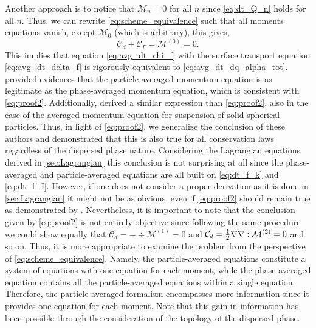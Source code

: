 Another approach is to notice that $\mathcal{M}_n=0$ for all $n$ since \ref{eq:dt_Q_n} holds for all $n$. 
Thus, we can rewrite \ref{eq:scheme_equivalence} such that all moments equations vanish, except $\mathcal{M}_0$ (which is arbitrary), this gives, 
\begin{equation}
    \mathcal{C}_d 
    + \mathcal{C}_\Gamma 
    = \mathcal{M}^{(0)} = 0.
    \label{eq:proof2}
\end{equation}
This implies that equation \ref{eq:avg_dt_chi_f} with the surface transport equation \ref{eq:avg_dt_delta_f} is rigorously equivalent to \ref{eq:avg_dt_dq_alpha_tot}.
\citet[Appendix A]{zhang1997momentum} provided evidences that the particle-averaged momentum equation is as legitimate as the phase-averaged momentum equation, which is consistent with \ref{eq:proof2}. 
Additionally, \citet[Appendix A]{nott2011suspension} derived a similar expression than \ref{eq:proof2}, also in the case of the averaged momentum equation for suspension of solid spherical particles.
Thus, in light of \ref{eq:proof2}, we generalize the conclusion of these authors and demonstrated that this is also true for all conservation laws regardless of the dispersed phase nature.  
Considering the Lagrangian equations derived in \ref{sec:Lagrangian} this conclusion is not surprising at all since the phase-averaged and particle-averaged equations are all built on \ref{eq:dt_f_k} and \ref{eq:dt_f_I}.
However, if one does not consider a proper derivation as it is done in \ref{sec:Lagrangian} it might not be as obvious, even if \ref{eq:proof2} should remain true as demonstrated by \citet{zhang1997momentum,nott2011suspension}.
Nevertheless, it is important to note that the conclusion given by \ref{eq:proof2} is not entirely objective since following the same procedure we could show equally that $\mathcal{C}_d  = -\div\mathcal{M}^{(1)}=0$ and $\mathcal{C}_d  = \frac{1}{2}\mathbf{\nabla}\mathbf{\nabla}:\mathcal{M}^{(2)}=0$ and so on. 
Thus, it is more appropriate to examine the problem from the perspective of \ref{eq:scheme_equivalence}. 
Namely, the particle-averaged equations constitute a system of equations with one equation for each moment, while the phase-averaged equation contains all the particle-averaged equations within a single equation.
Therefore, the particle-averaged formalism encompasses more information since it provides one equation for each moment. 
Note that this gain in information has been possible through the consideration of the topology of the dispersed phase. 




